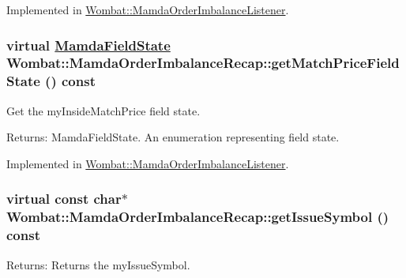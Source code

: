 Implemented in \hyperlink{classWombat_1_1MamdaOrderImbalanceListener_d55a2fc95960a2629c498eba6fb8b43d}{Wombat::Mamda\-Order\-Imbalance\-Listener}.\hypertarget{classWombat_1_1MamdaOrderImbalanceRecap_3f065a9bdc4535525b7f4842f997ce9c}{
\subsubsection[getMatchPriceFieldState]{\setlength{\rightskip}{0pt plus 5cm}virtual \hyperlink{namespaceWombat_93aac974f2ab713554fd12a1fa3b7d2a}{Mamda\-Field\-State} Wombat::Mamda\-Order\-Imbalance\-Recap::get\-Match\-Price\-Field\-State () const}}
\label{classWombat_1_1MamdaOrderImbalanceRecap_3f065a9bdc4535525b7f4842f997ce9c}


Get the my\-Inside\-Match\-Price field state. 

\begin{Desc}
\item[Returns:]Mamda\-Field\-State. An enumeration representing field state. \end{Desc}


Implemented in \hyperlink{classWombat_1_1MamdaOrderImbalanceListener_ca43f8571100db2c3dc6a81c9ece7d4b}{Wombat::Mamda\-Order\-Imbalance\-Listener}.\hypertarget{classWombat_1_1MamdaOrderImbalanceRecap_7a63844c647b4b13d5f2d07f5e27d719}{
\subsubsection[getIssueSymbol]{\setlength{\rightskip}{0pt plus 5cm}virtual const char$\ast$ Wombat::Mamda\-Order\-Imbalance\-Recap::get\-Issue\-Symbol () const}}
\label{classWombat_1_1MamdaOrderImbalanceRecap_7a63844c647b4b13d5f2d07f5e27d719}


\begin{Desc}
\item[Returns:]Returns the my\-Issue\-Symbol. \end{Desc}


